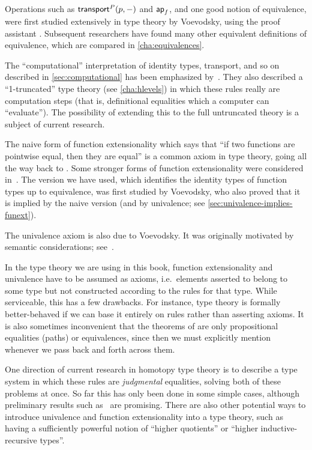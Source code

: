 Operations such as $\mathsf{transport}^{P}(p,-)$ and $\mathsf{ap}_{f}$, and one good notion of equivalence, were first studied extensively in type theory by Voevodsky, using the proof assistant \Coq.
Subsequent researchers have found many other equivalent definitions of equivalence, which are compared in \autoref{cha:equivalences}.

The ``computational'' interpretation of identity types, transport, and so on described in \autoref{sec:computational} has been emphasized by~\cite{lh:canonicity}.
They also described a ``1-truncated'' type theory (see \autoref{cha:hlevels}) in which these rules really are computation steps (that is, definitional equalities which a computer can ``evaluate'').
The possibility of extending this to the full untruncated theory is a subject of current research.

%
The naive form of function extensionality which says that ``if two functions are pointwise equal, then they are equal'' is a common axiom in type theory, going all the way back to \cite{PM2}.
Some stronger forms of function extensionality were considered in~\cite{garner:depprod}.
The version we have used, which identifies the identity types of function types up to equivalence, was first studied by Voevodsky, who also proved that it is implied by the naive version (and by univalence; see \autoref{sec:univalence-implies-funext}).

%
The univalence axiom is also due to Voevodsky.
It was originally motivated by semantic considerations; see~\cite{klv:ssetmodel}.

In the type theory we are using in this book, function extensionality and univalence have to be assumed as axioms, i.e.\ elements asserted to belong to some type but not constructed according to the rules for that type.
While serviceable, this has a few drawbacks.
For instance, type theory is formally better-behaved if we can base it entirely on rules rather than asserting axioms.
It is also sometimes inconvenient that the theorems of  are only propositional equalities (paths) or equivalences, since then we must explicitly mention whenever we pass back and forth across them.

One direction of current research in homotopy type theory is to describe a type system in which these rules are \emph{judgmental} equalities, solving both of these problems at once.
So far this has only been done in some simple cases, although preliminary results such as~\cite{lh:canonicity} are promising.
There are also other potential ways to introduce univalence and function extensionality into a type theory, such as having a sufficiently powerful notion of ``higher quotients'' or ``higher inductive-recursive types''.

